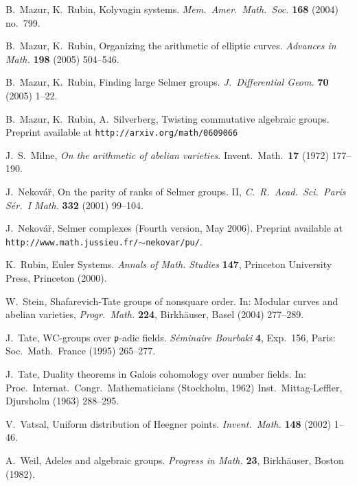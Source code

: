 \documentclass[reqno]{amsart}
\theoremstyle{definition}
\def\p{\mathfrak{p}}
\begin{document}
\begin{thebibliography}{MR1}
   B.\ Mazur, K.\ Rubin, Kolyvagin systems.  
   {\em Mem.\ Amer.\ Math.\ Soc.} {\bf 168} (2004) no.~799.

   B.\ Mazur, K.\ Rubin, Organizing the arithmetic of elliptic curves.  
   {\em Advances in Math.} {\bf 198} (2005) 504--546.

   B.\ Mazur, K.\ Rubin, Finding large Selmer groups.  
   {\em J.\ Differential Geom.} {\bf 70} (2005) 1--22.

   B.\ Mazur, K.\ Rubin, A.\ Silverberg, Twisting commutative algebraic groups.  
   Preprint available at 
   {\tt http://arxiv.org/math/0609066}

     J.\ S.\ Milne, {\em On the arithmetic of abelian varieties}. 
     Invent.\ Math.\ {\bf 17} (1972) 177--190.     

   J.\ Nekov\'a\u{r}, On the parity of ranks of Selmer groups. II,
   {\em  C.\ R.\ Acad.\ Sci.\ Paris S\'er.\ I Math.} {\bf 332} (2001) 99--104. 
   
   J.\ Nekov\'a\u{r}, Selmer complexes (Fourth version, May 2006).  
   Preprint available at 
   {\tt  http://www.math.jussieu.fr/$\sim$nekovar/pu/}.

   K.\ Rubin, Euler Systems.  {\em Annals of Math. Studies} {\bf 147},
   Princeton University Press, Princeton (2000).

   W.\ Stein, 
   Shafarevich-Tate groups of nonsquare order. In: Modular curves and abelian 
   varieties, {\em Progr.\ Math.} {\bf 224}, Birkh\"auser, Basel (2004) 277--289.

    J.\ Tate, WC-groups over $\p$-adic fields.  {\em S\'eminaire Bourbaki} 
    {\bf 4}, Exp.\ 156, Paris: Soc.\ Math.\ France (1995) 265--277.

    J.\ Tate, Duality theorems in Galois cohomology over number fields.  
    In: Proc.\ Internat.\ Congr.\ Mathematicians (Stockholm, 1962)
    Inst.\ Mittag-Leffler, Djursholm (1963) 288--295.

   V.\ Vatsal, Uniform distribution of Heegner points. 
   {\em Invent.\ Math.} {\bf 148} (2002) 1--46. 

    A.\ Weil,
    Adeles and algebraic groups. {\em Progress in Math.} {\bf 23},
    Birkh\"auser, Boston (1982).
    
\end{thebibliography}
\end{document}
